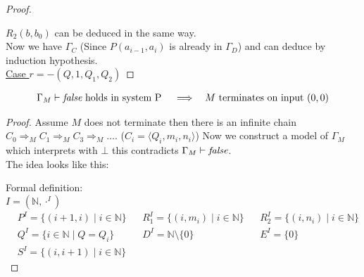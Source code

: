 \begin{proof}
\begin{figure}[H]
\end{figure}
$R_2(b,b_0)$ can be deduced in the same way.\\
Now we have $\Gamma_C$ (Since $P(a_{i-1},a_i)$ is already in $\Gamma_D$) and can deduce \false{} by induction hypothesis.\\
\underline{Case $r=-(Q,1,Q_1,Q_2)$}
\end{proof}
\begin{claim}
\begin{align*}
&\text{$\Gamma_M\vdash\emph{false}$ holds in system P} && \implies &\text{$M$ terminates on input $(0,0)$}
\end{align*}
\end{claim}
\begin{proof}
Assume $M$ does not terminate then there is an infinite chain $C_0\Rightarrow_M C_1\Rightarrow_M C_3\Rightarrow_M\dots$. ($C_i=\langle Q_i,m_i,n_i\rangle$) Now we construct a model of $\Gamma_M$ which interprets \false{} with $\bot$ this contradicts $\Gamma_M\vdash\emph{false}$.\\
The idea looks like this:\\
\begin{figure}[H]

\end{figure}
Formal definition:\\
$I=(\mathbb{N},\cdot^I)$
\begin{align*}
& P^I=\{(i+1,i)\mid i\in\mathbb{N}\} && R_1^I=\{(i,m_i)\mid i\in\mathbb{N}\} && R_2^I=\{(i,n_i)\mid i\in\mathbb{N}\}\\
& Q^I=\{ i\in\mathbb{N}\mid Q=Q_i\} && D^I=\mathbb{N}\setminus\{0\} && E^I=\{0\}\\
& S^I=\{(i,i+1)\mid i\in\mathbb{N}\}
\end{align*}
\end{proof}